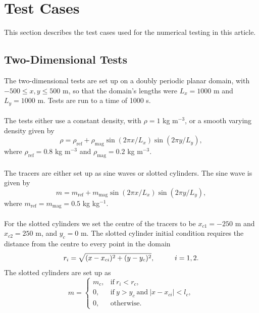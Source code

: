 \documentclass[11pt,a4paper]{article}
\begin{document}
\appendix

\section{Test Cases}

This section describes the test cases used for the numerical testing in this article. 

\subsection{Two-Dimensional Tests}

The two-dimensional tests are set up on a doubly periodic planar domain, with $-500 \leq x,y \leq 500$ m, so that the domain's lengths were $L_x=1000$ m and $L_y=1000$ m.
Tests are run to a time of 1000 s.
\\
\\
The tests either use a constant density, with $\rho=1$ kg m$^{-3}$, or a smooth varying density given by
\begin{equation}
    \rho = \rho_{\mathrm{ref}} + \rho_{\mathrm{mag}} \sin(2 \pi x/L_x) \sin(2 \pi y/L_y),
\end{equation}
where $\rho_{\mathrm{ref}}=0.8$ kg m$^{-3}$ and $\rho_{\mathrm{mag}}=0.2$ kg m$^{-3}$. \\ 
\\
The tracers are either set up as sine waves or slotted cylinders. The sine wave is given by
\begin{equation}
    m = m_{\mathrm{ref}} + m_{\mathrm{mag}} \sin(2 \pi x/L_x) \sin(2 \pi y/L_y),
\end{equation} 
where $m_{\mathrm{ref}}=m_{\mathrm{mag}}=0.5$ kg kg$^{-1}$. \\
\\
For the slotted cylinders we set the centre of the tracers to be $x_{c1} = -250$ m and $x_{c2}=250$ m, and $y_c=0$ m.
The slotted cylinder initial condition requires the distance from the centre to every point in the domain
\begin{equation}
    r_i = \sqrt{(x-x_{ci})^2+(y-y_c)^2}, \hspace*{1cm} i=1,2.
\end{equation}
The slotted cylinders are set up as
\begin{equation}
    m = 
    \begin{cases}
        m_c, & \mathrm{if} \ r_i < r_c, \\
        0, & \mathrm{if} \ y>y_c \ \mathrm{and} \ |x-x_{ci}|<l_c, \\
        0, & \mathrm{otherwise}.
    \end{cases}
\end{equation}
\end{document}
